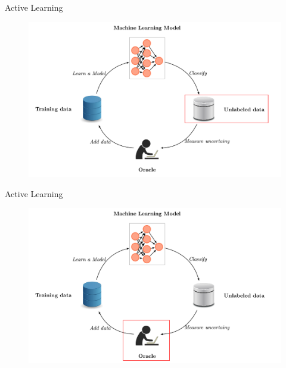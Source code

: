\documentclass[10pt]{beamer}
\begin{document}
\begin{frame}[fragile]{Active Learning}
    \begin{figure}[htp]
        \centering
        \includegraphics[scale=0.3]{images/active_learning_unlabeled.png}
    \end{figure}
\end{frame}

\begin{frame}[fragile]{Active Learning}
    \begin{figure}[htp]
        \centering
        \includegraphics[scale=0.3]{images/active_learning_oracle.png}
    \end{figure}
\end{frame}
\end{document}
